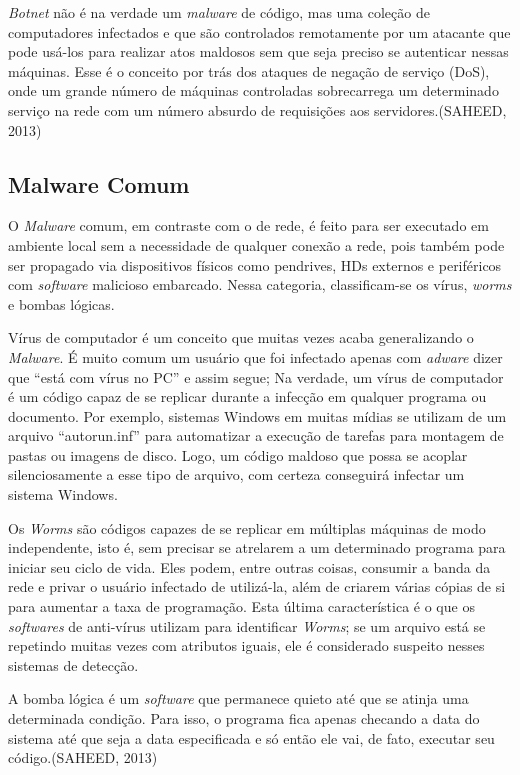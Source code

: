 \textit{Botnet} não é na verdade um \textit{malware} de código, mas uma coleção de computadores
infectados e que são controlados remotamente por um atacante que pode usá-los
para realizar atos maldosos sem que seja preciso se autenticar nessas
máquinas. Esse é o conceito por trás dos ataques de negação de serviço (DoS),
onde um grande número de máquinas controladas sobrecarrega um determinado
serviço na rede com um número absurdo de requisições aos servidores.(SAHEED, 2013)

\subsection{Malware Comum}
\label{ss.malware_comum}

O \textit{Malware} comum, em contraste com o de rede, é feito para ser executado em
ambiente local sem a necessidade de qualquer conexão a rede, pois também pode
ser propagado via dispositivos físicos como pendrives, HDs externos e
periféricos com \textit{software} malicioso embarcado. Nessa categoria, classificam-se os vírus, \textit{worms} e bombas lógicas.

Vírus de computador é um conceito que muitas vezes acaba generalizando o
\textit{Malware}. É muito comum um usuário que foi infectado apenas com \textit{adware} dizer
que ``está com vírus no PC'' e assim segue; Na verdade, um vírus de computador
é um código capaz de se replicar durante a infecção em qualquer programa ou
documento. Por exemplo, sistemas Windows em muitas mídias se utilizam de um
arquivo ``autorun.inf'' para automatizar a execução de tarefas para montagem
de pastas ou imagens de disco. Logo, um código maldoso que possa se acoplar
silenciosamente a esse tipo de arquivo, com certeza conseguirá infectar um
sistema Windows.

Os \textit{Worms} são códigos capazes de se replicar em múltiplas máquinas de modo
independente, isto é, sem precisar se atrelarem a um determinado programa para
iniciar seu ciclo de vida. Eles podem, entre outras coisas, consumir a banda
da rede e privar o usuário infectado de utilizá-la, além de criarem várias
cópias de si para aumentar a taxa de programação. Esta última característica é
o que os \textit{softwares} de anti-vírus utilizam para identificar \textit{Worms}; se um
arquivo está se repetindo muitas vezes com atributos iguais, ele é considerado
suspeito nesses sistemas de detecção.

A bomba lógica é um \textit{software} que permanece quieto até que se atinja uma
determinada condição. Para isso, o programa fica apenas checando a data do
sistema até que seja a data especificada e só então ele vai, de fato, executar
seu código.(SAHEED, 2013)

